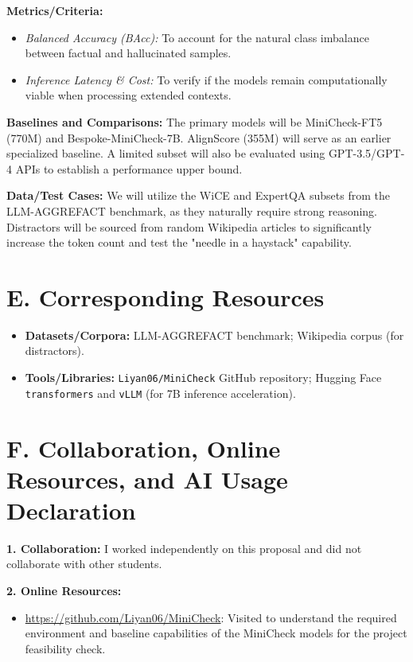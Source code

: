 \documentclass[12pt, letterpaper]{article}
\begin{document}
\textbf{Metrics/Criteria:} 
\begin{itemize}[leftmargin=*]
    \item \textit{Balanced Accuracy (BAcc):} To account for the natural class imbalance between factual and hallucinated samples.
    \item \textit{Inference Latency \& Cost:} To verify if the models remain computationally viable when processing extended contexts.
\end{itemize}

\textbf{Baselines and Comparisons:} 
The primary models will be MiniCheck-FT5 (770M) and Bespoke-MiniCheck-7B. AlignScore (355M) will serve as an earlier specialized baseline. A limited subset will also be evaluated using GPT-3.5/GPT-4 APIs to establish a performance upper bound.

\textbf{Data/Test Cases:} 
We will utilize the WiCE and ExpertQA subsets from the LLM-AGGREFACT benchmark, as they naturally require strong reasoning. Distractors will be sourced from random Wikipedia articles to significantly increase the token count and test the "needle in a haystack" capability.

\section*{E. Corresponding Resources}

\begin{itemize}[leftmargin=*]
    \item \textbf{Datasets/Corpora:} LLM-AGGREFACT benchmark; Wikipedia corpus (for distractors).
    \item \textbf{Tools/Libraries:} \texttt{Liyan06/MiniCheck} GitHub repository; Hugging Face \texttt{transformers} and \texttt{vLLM} (for 7B inference acceleration).
\end{itemize}




\section*{F. Collaboration, Online Resources, and AI Usage Declaration}

\textbf{1. Collaboration:} 
I worked independently on this proposal and did not collaborate with other students.

\textbf{2. Online Resources:} 
\begin{itemize}[leftmargin=*]
    \item \url{https://github.com/Liyan06/MiniCheck}: Visited to understand the required environment and baseline capabilities of the MiniCheck models for the project feasibility check.
\end{itemize}
\end{document}
